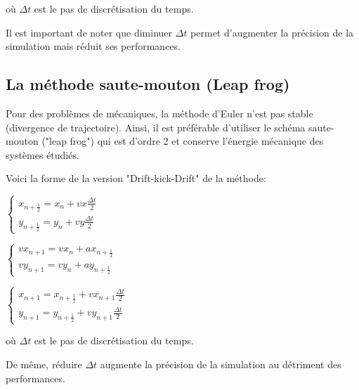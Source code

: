 \vspace{2mm}

où $\Delta t$ est le pas de discrétisation du temps.

Il est important de noter que diminuer $\Delta t$ permet d'augmenter la précision de la simulation mais réduit ses performances.

\vspace{2mm}

\subsection{La méthode saute-mouton (Leap frog)}
Pour des problèmes de mécaniques, la méthode d'Euler n'est pas stable (divergence de trajectoire). Ainsi, il est préférable d'utiliser le schéma saute-mouton ("leap frog") qui est d'ordre 2 et conserve l'énergie mécanique des systèmes étudiés.

\vspace{3mm}
Voici la forme de la version "Drift-kick-Drift" de la méthode:
\vspace{2mm}

$
\left\{
    \begin{array}{ll}
        x_{n+\frac{1}{2}} = x_n + vx \frac{\Delta t}{2} \\
        y_{n+\frac{1}{2}} = y_n + vy \frac{\Delta t}{2}
    \end{array}
\right.
$

\vspace{3mm}

$
\left\{
    \begin{array}{ll}
        vx_{n+1} = vx_n + ax_{n+\frac{1}{2}} \\
        vy_{n+1} = vy_n + ay_{n+\frac{1}{2}}
    \end{array}
\right.
$

\vspace{3mm}

$
\left\{
    \begin{array}{ll}
        x_{n+1} = x_{n+\frac{1}{2}} + vx_{n+1}\frac{\Delta t}{2}\\
        y_{n+1} = y_{n+\frac{1}{2}} + vy_{n+1}\frac{\Delta t}{2}
    \end{array}
\right.
$

\vspace{2mm}

où $\Delta t$ est le pas de discrétisation du temps.

De même, réduire $\Delta t$ augmente la précision de la simulation au détriment des performances.
